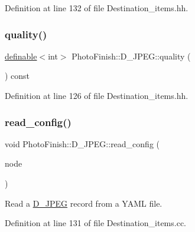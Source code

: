Definition at line 132 of file Destination\+\_\+items.\+hh.

\mbox{\label{class_photo_finish_1_1_d___j_p_e_g_a56ced1254040a8160fe4035e51eee712}} 
\subsubsection{\texorpdfstring{quality()}{quality()}}
{\footnotesize\ttfamily \hyperlink{class_photo_finish_1_1definable}{definable}$<$int$>$ Photo\+Finish\+::\+D\+\_\+\+J\+P\+E\+G\+::quality (\begin{DoxyParamCaption}\item[{void}]{ }\end{DoxyParamCaption}) const\hspace{0.3cm}{\ttfamily [inline]}}



Definition at line 126 of file Destination\+\_\+items.\+hh.

\mbox{\label{class_photo_finish_1_1_d___j_p_e_g_ad86821d2da1e25621fb3d21f2ced45be}} 
\subsubsection{\texorpdfstring{read\+\_\+config()}{read\_config()}}
{\footnotesize\ttfamily void Photo\+Finish\+::\+D\+\_\+\+J\+P\+E\+G\+::read\+\_\+config (\begin{DoxyParamCaption}\item[{const Y\+A\+M\+L\+::\+Node \&}]{node }\end{DoxyParamCaption})}



Read a \hyperlink{class_photo_finish_1_1_d___j_p_e_g}{D\+\_\+\+J\+P\+EG} record from a Y\+A\+ML file. 



Definition at line 131 of file Destination\+\_\+items.\+cc.

\mbox{\label{class_photo_finish_1_1_d___j_p_e_g_a240c8b80a7528adf18732bd6acb0558e}} 
